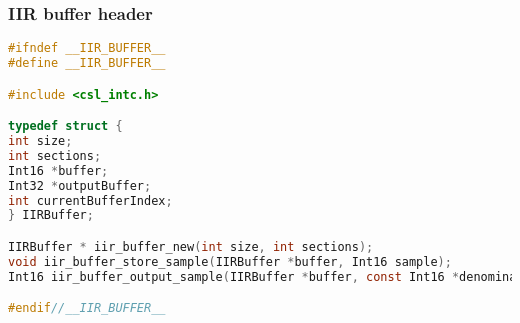 \subsubsection{IIR buffer header}
\begin{lstlisting}[language=c]
#ifndef __IIR_BUFFER__
#define __IIR_BUFFER__

#include <csl_intc.h>

typedef struct {
int size;
int sections;
Int16 *buffer;
Int32 *outputBuffer;
int currentBufferIndex;
} IIRBuffer;

IIRBuffer * iir_buffer_new(int size, int sections);
void iir_buffer_store_sample(IIRBuffer *buffer, Int16 sample);
Int16 iir_buffer_output_sample(IIRBuffer *buffer, const Int16 *denominator, const Int16 *numerator);

#endif//__IIR_BUFFER__
    
\end{lstlisting}
\clearpage

